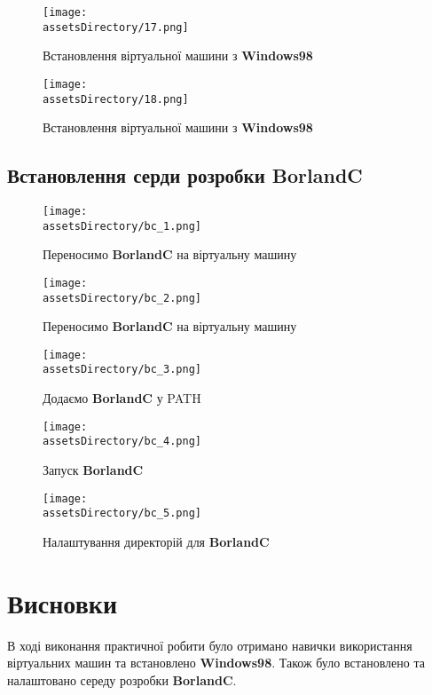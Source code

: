 \begin{figure}[ht!]
    \centering
    \texttt{[image: \\assetsDirectory/17.png]}
    \caption{Встановлення віртуальної машини з \textbf{Windows98}}
\end{figure}

\begin{figure}[ht!]
    \centering
    \texttt{[image: \\assetsDirectory/18.png]}
    \caption{Встановлення віртуальної машини з \textbf{Windows98}}
\end{figure}

\clearpage

\subsection{Встановлення серди розробки \textbf{BorlandC}}
\begin{figure}[ht!]
    \centering
    \texttt{[image: \\assetsDirectory/bc\_1.png]}
    \caption{Переносимо \textbf{BorlandC} на віртуальну машину}
\end{figure}

\begin{figure}[ht!]
    \centering
    \texttt{[image: \\assetsDirectory/bc\_2.png]}
    \caption{Переносимо \textbf{BorlandC} на віртуальну машину}
\end{figure}

\begin{figure}[ht!]
    \centering
    \texttt{[image: \\assetsDirectory/bc\_3.png]}
    \caption{Додаємо \textbf{BorlandC} у PATH}
\end{figure}

\begin{figure}[ht!]
    \centering
    \texttt{[image: \\assetsDirectory/bc\_4.png]}
    \caption{Запуск \textbf{BorlandC}}
\end{figure}

\begin{figure}[ht!]
    \centering
    \texttt{[image: \\assetsDirectory/bc\_5.png]}
    \caption{Налаштування директорій для \textbf{BorlandC}}
\end{figure}

\clearpage
\section{Висновки}
В ході виконання практичної робити було отримано навички використання віртуальних машин та встановлено
\textbf{Windows98}. Також було встановлено та налаштовано середу розробки \textbf{BorlandC}.